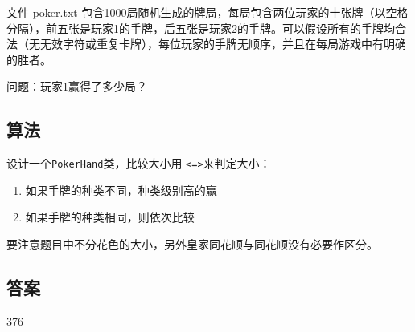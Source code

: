 \begin{tcolorbox}[breakable]
    文件 \href{https://projecteuler.net/resources/documents/0054_poker.txt}{poker.txt} 包含1000局随机生成的牌局，每局包含两位玩家的十张牌（以空格分隔），前五张是玩家1的手牌，后五张是玩家2的手牌。可以假设所有的手牌均合法（无无效字符或重复卡牌），每位玩家的手牌无顺序，并且在每局游戏中有明确的胜者。

	问题：玩家1赢得了多少局？

\end{tcolorbox}

\subsection{算法}
设计一个\texttt{PokerHand}类，比较大小用 \texttt{<=>}来判定大小：
\begin{enumerate}
    \item 如果手牌的种类不同，种类级别高的赢
    \item 如果手牌的种类相同，则依次比较
\end{enumerate}
要注意题目中不分花色的大小，另外皇家同花顺与同花顺没有必要作区分。

\subsection{答案}
376
